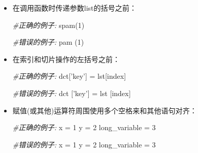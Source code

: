 \documentclass[ignorenonframetext,9pt]{beamer}
\newenvironment{Shaded}{}{}
\newcommand{\CommentTok}[1]{\textcolor[rgb]{0.38,0.63,0.69}{\textit{#1}}}
\newcommand{\DecValTok}[1]{\textcolor[rgb]{0.25,0.63,0.44}{#1}}
\newcommand{\NormalTok}[1]{#1}
\newcommand{\OperatorTok}[1]{\textcolor[rgb]{0.40,0.40,0.40}{#1}}
\newcommand{\StringTok}[1]{\textcolor[rgb]{0.25,0.44,0.63}{#1}}
\begin{document}
\begin{frame}[fragile]

\begin{itemize}
\item
  在调用函数时传递参数list的括号之前：

\begin{Shaded}
\begin{Highlighting}[]
\CommentTok{#正确的例子:}
\NormalTok{spam(}\DecValTok{1}\NormalTok{)}

\CommentTok{#错误的例子:}
\NormalTok{pam (}\DecValTok{1}\NormalTok{)}
\end{Highlighting}
\end{Shaded}
\item
  在索引和切片操作的左括号之前：

\begin{Shaded}
\begin{Highlighting}[]
\CommentTok{#正确的例子:}
\NormalTok{dct[}\StringTok{'key'}\NormalTok{] }\OperatorTok{=}\NormalTok{ lst[index]}

\CommentTok{#错误的例子:}
\NormalTok{dct [}\StringTok{'key'}\NormalTok{] }\OperatorTok{=}\NormalTok{ lst [index]}
\end{Highlighting}
\end{Shaded}
\end{itemize}

\end{frame}

\begin{frame}[fragile]

\begin{itemize}
\item
  赋值(或其他)运算符周围使用多个空格来和其他语句对齐：

\begin{Shaded}
\begin{Highlighting}[]
\CommentTok{#正确的例子:}
\NormalTok{x }\OperatorTok{=} \DecValTok{1}
\NormalTok{y }\OperatorTok{=} \DecValTok{2}
\NormalTok{long_variable }\OperatorTok{=} \DecValTok{3}

\CommentTok{#错误的例子:}
\NormalTok{x             }\OperatorTok{=} \DecValTok{1}
\NormalTok{y             }\OperatorTok{=} \DecValTok{2}
\NormalTok{long_variable }\OperatorTok{=} \DecValTok{3}
\end{Highlighting}
\end{Shaded}
\end{itemize}

\end{frame}
\end{document}
